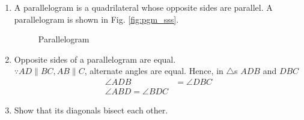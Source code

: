 \renewcommand{\theequation}{\theenumi}
\begin{enumerate}[label=\arabic*.,ref=\thesubsection.\theenumi]
\item A parallelogram is a quadrilateral whose opposite sides are parallel. A parallelogram is shown in Fig. \eqref{fig:pgm_sss}.	

%
\begin{figure}[!ht]
	\begin{center}
		\resizebox{\columnwidth}{!}{}
	\end{center}
	\caption{Parallelogram}
	\label{fig:pgm_sss}	
\end{figure}

\item Opposite sides of a parallelogram are equal.
\\
\solution $\because AD \parallel BC, AB \parallel C$, alternate angles are equal.  Hence, in $\triangle$s $ADB$ and $DBC$
%
\begin{align}
\angle ADB &= \angle DBC
\\
\angle ABD = \angle BDC
\end{align}

\item Show that its diagonals bisect each other.
\\
\solution 


\end{enumerate}
